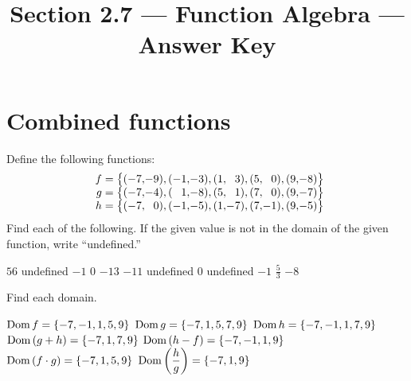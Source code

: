 

\title{Section 2.7 --- Function Algebra --- Answer Key}


\maketitle
\section*{Combined functions}
Define the following functions:
\[
\begin{array}{r@{\;=\big\{(}r@{,}r@{),(}r@{,}r@{),(}r@{,}r@{),(}r@{,}r@{),(}r@{,}r@{)\big\}}}
f&-7&-9&-1&-3&1&3&5&0&9&-8\\
g&-7&-4&1&-8&5&1&7&0&9&-7\\
h&-7&0&-1&-5&1&-7&7&-1&9&-5
\end{array}
\]
Find each of the following.  If the given value is not in the domain of the given function, write ``undefined.''
\begin{smenum}
\mitemxxxx
{$56$}
{undefined}
{$-1$}
{$0$}
\mitemxxxx
{$-13$}
{$-11$}
{undefined}
{$0$}
\mitemxxxx
{undefined}
{$-1$}
{$\frac{5}{3}$}
{$-8$}
\end{smenum}
Find each domain.
\begin{smenum}
\mitemxx
{$\operatorname{Dom} f=\left\{-7,-1,1,5,9\right\}$}
{$\operatorname{Dom} g=\left\{-7,1,5,7,9\right\}$}
\mitemxx
{$\operatorname{Dom} h=\left\{-7,-1,1,7,9\right\}$}
{$\operatorname{Dom}\left(g+h\right)=\left\{-7,1,7,9\right\}$}
\mitemxx
{$\operatorname{Dom}\left(h-f\right)=\left\{-7,-1,1,9\right\}$}
{$\operatorname{Dom}\left(f\cdot g\right)=\left\{-7,1,5,9\right\}$}
\mitemx
{$\operatorname{Dom}\left(\dfrac{h}{g}\right)=\left\{-7,1,9\right\}$}
\end{smenum}


